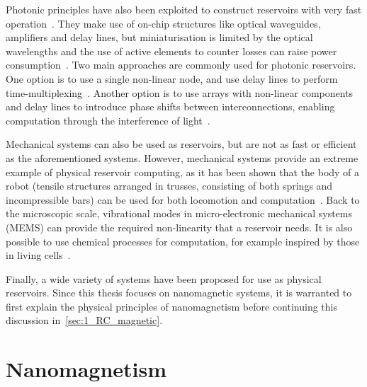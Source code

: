 Photonic principles have also been exploited to construct reservoirs with very fast operation~\cite{RC_RecentAdvances}.
They make use of on-chip structures like optical waveguides, amplifiers and delay lines, but miniaturisation is limited by the optical wavelengths and the use of active elements to counter losses can raise power consumption~\cite{RC_RecentAdvances}.
Two main approaches are commonly used for photonic reservoirs.
One option is to use a single non-linear node, and use delay lines to perform time-multiplexing~\cite{appeltant2011information,RC_AllOptical}.
Another option is to use arrays with non-linear components and delay lines to introduce phase shifts between interconnections, enabling computation through the interference of light~\cite{RC_Photonic,RC_PhotonicSi}. \par
Mechanical systems can also be used as reservoirs, but are not as fast or efficient as the aforementioned systems.
However, mechanical systems provide an extreme example of physical reservoir computing, as it has been shown that the body of a  robot (tensile structures arranged in trusses, consisting of both springs and incompressible bars) can be used for both locomotion and computation~\cite{RC_Tensegrity}.
Back to the microscopic scale, vibrational modes in micro-electronic mechanical systems (MEMS) can provide the required non-linearity that a reservoir needs.
It is also possible to use chemical processes for computation, for example inspired by those in living cells~\cite{NanoscaleRC,ElectrochemicalPRC,RC_Chemical}. \par
Finally, a wide variety of  systems have been proposed for use as physical reservoirs.
Since this thesis focuses on nanomagnetic systems, it is warranted to first explain the physical principles of nanomagnetism before continuing this discussion in~\cref{sec:1_RC_magnetic}.

\newpage
\section{Nanomagnetism}\label{sec:1:Nanomagnetism}
